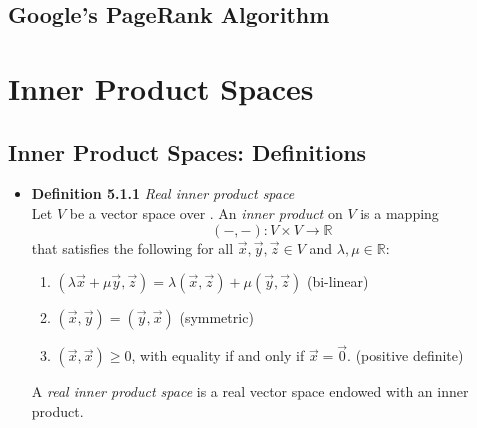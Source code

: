\documentclass[11pt,a4paper]{article}
\begin{document}
\subsection{Google's PageRank Algorithm}

\break{}

\section{Inner Product Spaces}

\subsection{Inner Product Spaces: Definitions}

\begin{itemize}

    \item \textbf{Definition 5.1.1} \emph{Real inner product space} \\
        Let $V$ be a vector space over .
        An \emph{inner product} on $V$ is a mapping
        \[
            (-, -) : V \times V \to \mathbb{R}
        \]
        that satisfies the following for all $\vec{x}, \vec{y}, \vec{z} \in V$
        and $\lambda, \mu \in \mathbb{R}$:
        \begin{enumerate}
            \item $(\lambda \vec{x} + \mu \vec{y}, \vec{z}) =
                \lambda(\vec{x}, \vec{z}) + \mu(\vec{y}, \vec{z})$
                \quad (bi-linear)
            \item $(\vec{x}, \vec{y}) = (\vec{y}, \vec{x})$
                \quad (symmetric)
            \item $(\vec{x}, \vec{x}) \geq 0$,
                with equality if and only if $\vec{x} = \vec{0}$.
                \quad (positive definite)
        \end{enumerate}
        A \emph{real inner product space} is a real vector space endowed with an inner product.


\end{itemize}
\end{document}
